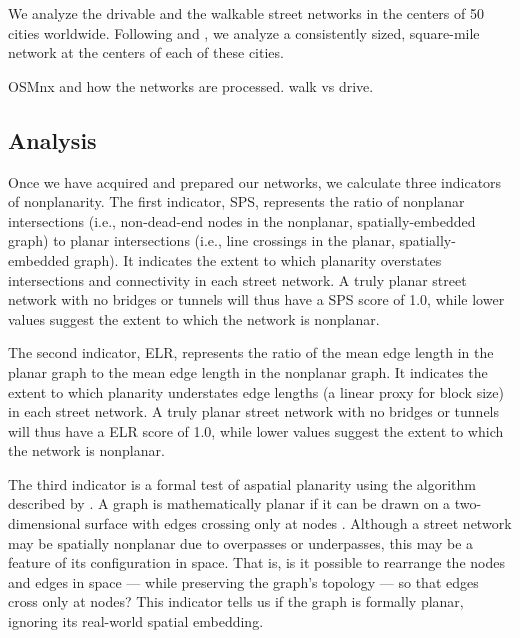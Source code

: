 \documentclass[Afour,sageh,times]{sagej}
\begin{document}
We analyze the drivable and the walkable street networks in the centers of 50 cities worldwide. Following \citet{jacobs_great_1995} and \citet{cardillo_structural_2006}, we analyze a consistently sized, square-mile network at the centers of each of these cities.

OSMnx and how the networks are processed. walk vs drive.

\subsection{Analysis}

Once we have acquired and prepared our networks, we calculate three indicators of nonplanarity. The first indicator, SPS, represents the ratio of nonplanar intersections (i.e., non-dead-end nodes in the nonplanar, spatially-embedded graph) to planar intersections (i.e., line crossings in the planar, spatially-embedded graph). It indicates the extent to which planarity overstates intersections and connectivity in each street network. A truly planar street network with no bridges or tunnels will thus have a SPS score of 1.0, while lower values suggest the extent to which the network is nonplanar.

The second indicator, ELR, represents the ratio of the mean edge length in the planar graph to the mean edge length in the nonplanar graph. It indicates the extent to which planarity understates edge lengths (a linear proxy for block size) in each street network. A truly planar street network with no bridges or tunnels will thus have a ELR score of 1.0, while lower values suggest the extent to which the network is nonplanar.

The third indicator is a formal test of aspatial planarity using the algorithm described by \citet{boyer_subgraph_2012}. A graph is mathematically planar if it can be drawn on a two-dimensional surface with edges crossing only at nodes \citep{trudeau_introduction_1994}. Although a street network may be spatially nonplanar due to overpasses or underpasses, this may be a feature of its configuration in space. That is, is it possible to rearrange the nodes and edges in space --- while preserving the graph's topology --- so that edges cross only at nodes? This indicator tells us if the graph is formally planar, ignoring its real-world spatial embedding.
\end{document}
